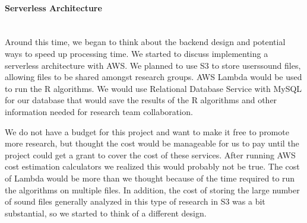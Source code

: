 \paragraph{Serverless Architecture} \mbox{}\\[\paragraphheaderspace]
Around this time, we began to think about the backend design and potential ways to speed up processing time. We started to discuss implementing a serverless architecture with AWS. We planned to use S3 to store users\textquotesingle  sound files, allowing files to be shared amongst research groups. AWS Lambda would be used to run the R algorithms. We would use Relational Database Service with MySQL for our database that would save the results of the R algorithms and other information needed for research team collaboration.\par
We do not have a budget for this project and want to make it free to promote more research, but thought the cost would be manageable for us to pay until the project could get a grant to cover the cost of these services. After running AWS cost estimation calculators we realized this would probably not be true. The cost of Lambda would be more than we thought because of the time required to run the algorithms on multiple files. In addition, the cost of storing the large number of sound files generally analyzed in this type of research in S3 was a bit substantial, so we started to think of a different design.\par

